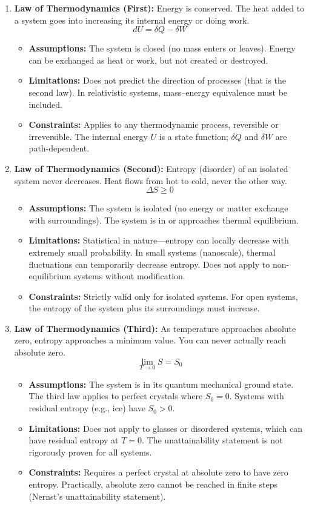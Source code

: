\documentclass[11pt,openright]{book}
\begin{document}
\begin{enumerate}
\item \textbf{Law of Thermodynamics (First):} Energy is conserved. The heat added to a system goes into increasing its internal energy or doing work.
\[
dU=\delta Q-\delta W
\]
\begin{itemize}
\item \textbf{Assumptions:} The system is closed (no mass enters or leaves). Energy can be exchanged as heat or work, but not created or destroyed.
\item \textbf{Limitations:} Does not predict the direction of processes (that is the second law). In relativistic systems, mass--energy equivalence must be included.
\item \textbf{Constraints:} Applies to any thermodynamic process, reversible or irreversible. The internal energy $U$ is a state function; $\delta Q$ and $\delta W$ are path-dependent.
\end{itemize}

\item \textbf{Law of Thermodynamics (Second):} Entropy (disorder) of an isolated system never decreases. Heat flows from hot to cold, never the other way.
\[
\Delta S\geq 0
\]
\begin{itemize}
\item \textbf{Assumptions:} The system is isolated (no energy or matter exchange with surroundings). The system is in or approaches thermal equilibrium.
\item \textbf{Limitations:} Statistical in nature---entropy can locally decrease with extremely small probability. In small systems (nanoscale), thermal fluctuations can temporarily decrease entropy. Does not apply to non-equilibrium systems without modification.
\item \textbf{Constraints:} Strictly valid only for isolated systems. For open systems, the entropy of the system plus its surroundings must increase.
\end{itemize}

\item \textbf{Law of Thermodynamics (Third):} As temperature approaches absolute zero, entropy approaches a minimum value. You can never actually reach absolute zero.
\[
\lim_{T\to 0}S=S_0
\]
\begin{itemize}
\item \textbf{Assumptions:} The system is in its quantum mechanical ground state. The third law applies to perfect crystals where $S_0=0$. Systems with residual entropy (e.g., ice) have $S_0>0$.
\item \textbf{Limitations:} Does not apply to glasses or disordered systems, which can have residual entropy at $T=0$. The unattainability statement is not rigorously proven for all systems.
\item \textbf{Constraints:} Requires a perfect crystal at absolute zero to have zero entropy. Practically, absolute zero cannot be reached in finite steps (Nernst's unattainability statement).
\end{itemize}


\end{enumerate}
\end{document}
